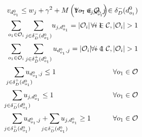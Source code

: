 \documentclass{article}
\begin{document}
\begin{alignat}{3}
    \label{mod:c10}        & v_{d^0_{o_1}}  \leq  w_j + \gamma^2 + M\left(1- u_{j,d^0_{o_1}}\right)                                                                                                                                                                                                                 & \hspace{-20mm}  \forall  o_1 \in \mathcal{O},  j \in \delta_{D}^{-}(d^0_{o_1})                   \\
    \label{mod:c11}        & \sum_{ \substack{o_1 \in \mathcal{O}_i }}{ \sum_{ j \in \delta^{-}_{D}(d^0_{o_1})}}{u_{j,d^0_{o_1} } } = |\mathcal{O}_i|-1                                                                                                                                                             & \hspace{-20mm} \forall  i \in \mathcal{C},|\mathcal{O}_i| > 1                                    \\
    \label{mod:c12}        & \sum_{ \substack{o_1 \in \mathcal{O}_i }}\sum_{ j \in \delta^{+}_{D}(d^0_{o_1})}{u_{d^0_{o_1},j } } = |\mathcal{O}_i|-1                                                                                                                                                                & \hspace{-40mm} \forall  i \in \mathcal{C}, |\mathcal{O}_i| > 1                                   \\
    \label{mod:c13}        & \hspace{3mm} \smashoperator{ \sum_{ j \in \delta^{+}_{D}(d^0_{o_1})}}{u_{d^0_{o_1},j } } \leq 1                                                                                                                                                                                        & \hspace{-20mm}  \forall o_1 \in \mathcal{O}                                                      \\
    \label{mod:c14}        & \hspace{2mm} \smashoperator{ \sum_{ j \in \delta^{-}_{D}(d^0_{o_1})}}{u_{j,d^0_{o_1} } } \leq 1                                                                                                                                                                                        & \hspace{-20mm} \forall o_1 \in \mathcal{O}                                                       \\
    \label{mod:c15}        & \hspace{2mm} \smashoperator{ \sum_{ j \in \delta^{+}_{D}(d^0_{o_1})}}{u_{d^0_{o_1},j } } +\smashoperator{ \sum_{ j \in \delta^{-}_{D}(d^0_{o_1})}}{u_{j,d^0_{o_1} } } \geq 1                                                                                                           & \hspace{-20mm} \forall o_1 \in \mathcal{O}                                                       \\

\end{alignat}
\end{document}
